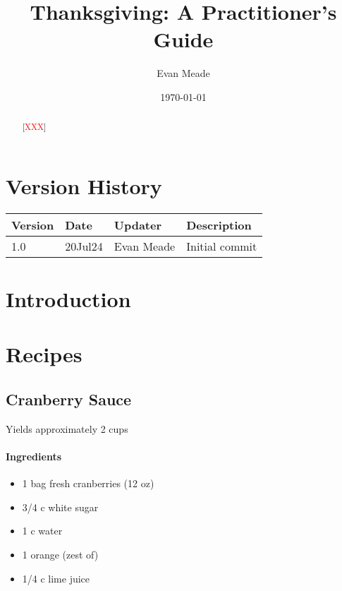 \documentclass[12pt]{article}
\title{Thanksgiving: A Practitioner's Guide}
\author{Evan Meade}
\date{\today}
\newcommand{\TODO}{[\textcolor{red}{XXX}]}
\newenvironment*{ingredients}
	{
		\paragraph*{Ingredients}
		\begin{itemize}
	}
	{
		\end{itemize}
	}
\begin{document}
	\fancyfoot[R]{\thepage}
	
	\maketitle
	
	\begin{abstract}
		\TODO
	\end{abstract}
	
	\newpage
	
	\section*{Version History}
	\begin{tabular}{|l|l|l|l|}
		\hline
		\textbf{Version} & \textbf{Date} & \textbf{Updater} & \textbf{Description} \\\hline
		1.0 & 20Jul24 & Evan Meade & Initial commit \\\hline
	\end{tabular}
	
	\newpage
	
	\tableofcontents
	
	\newpage
	
	
	\section{Introduction}
	
	\newpage
	
	\section{Recipes}
	
	\subsection{Cranberry Sauce}
	Yields approximately 2 cups
	
	\begin{ingredients}
		\item 1 bag fresh cranberries (12 oz)
		\item 3/4 c white sugar
		\item 1 c water
		\item 1 orange (zest of)
		\item 1/4 c lime juice
	\end{ingredients}
	
\end{document}
